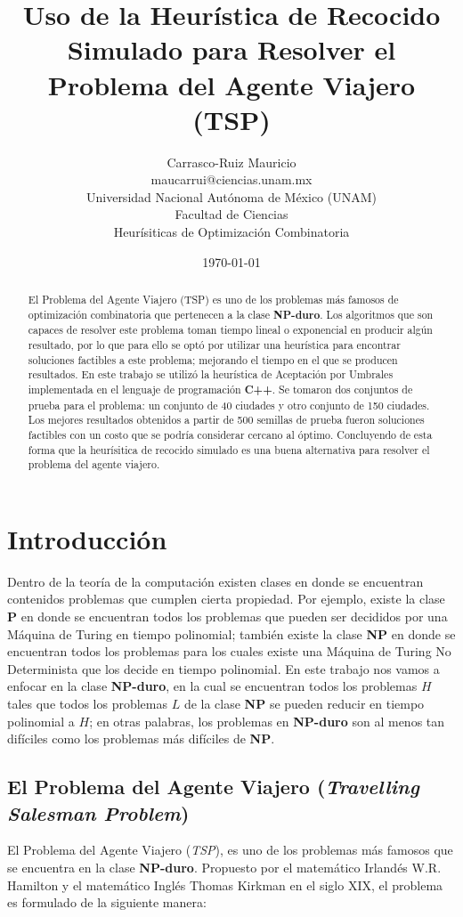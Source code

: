 \documentclass{article}
\title{Uso de la Heurística de Recocido Simulado para Resolver
       el Problema del Agente Viajero (TSP)}
\author{Carrasco-Ruiz Mauricio  \\
	maucarrui@ciencias.unam.mx  \\
        Universidad Nacional Autónoma de México (UNAM) \\
        Facultad de Ciencias \\
        Heurísiticas de Optimización Combinatoria \\
	}
\date{\today}
\newcommand{\tbf}[1]{\textbf{#1}}
\newcommand{\tit}[1]{\textit{#1}}
\begin{document}
  \maketitle


  \begin{abstract}
    El Problema del Agente Viajero (TSP) es uno de los problemas 
    más famosos de optimización combinatoria que pertenecen a la 
    clase \tbf{NP-duro}. Los algoritmos que son capaces de resolver
    este problema toman tiempo lineal o exponencial en producir algún 
    resultado, por lo que para ello se optó por utilizar una heurística
    para encontrar soluciones factibles a este problema; mejorando el
    tiempo en el que se producen resultados. En este trabajo se utilizó 
    la heurística de Aceptación por Umbrales implementada en el lenguaje de
    programación \tbf{C++}. Se tomaron dos conjuntos de prueba para 
    el problema: un conjunto de 40 ciudades y otro conjunto de 150 
    ciudades. Los mejores resultados obtenidos a partir de 500 semillas 
    de prueba fueron soluciones factibles con un costo que se podría 
    considerar cercano al óptimo. Concluyendo de esta forma 
    que la heurísitica de recocido simulado es una buena alternativa 
    para resolver el problema del agente viajero.
  \end{abstract}

  \section{Introducción} \label{intro}
  Dentro de la teoría de la computación existen clases en donde 
  se encuentran contenidos problemas que cumplen cierta propiedad. Por ejemplo,
  existe la clase \tbf{P} en donde se encuentran todos los problemas que 
  pueden ser decididos por una Máquina de Turing en tiempo polinomial;
  también existe la clase \tbf{NP} en donde se encuentran todos los 
  problemas para los cuales existe una Máquina de Turing No Determinista que
  los decide en tiempo polinomial. En este trabajo nos vamos a enfocar
  en la clase \tbf{NP-duro}, en la cual se encuentran todos los 
  problemas $H$ tales que todos los problemas $L$ de la clase \tbf{NP} se 
  pueden reducir en tiempo polinomial a $H$; en otras palabras, los problemas
  en \tbf{NP-duro} son al menos tan difíciles como los problemas más difíciles 
  de \tbf{NP}.

  \subsection{El Problema del Agente Viajero (\tit{Travelling Salesman Problem})}
  \label{TSP}
  El Problema del Agente Viajero (\tit{TSP}), es uno de los problemas más 
  famosos que se encuentra en la clase \tbf{NP-duro}. Propuesto por el 
  matemático Irlandés W.R. Hamilton y el matemático Inglés Thomas Kirkman 
  en el siglo XIX, el problema es formulado de la siguiente manera:
\end{document}
